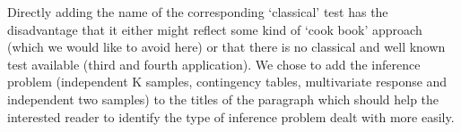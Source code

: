 \documentclass[11pt]{article}
\begin{document}
\begin{enumerate}
Directly adding the name of the
corresponding `classical' test has the disadvantage that it either might
reflect some kind of `cook book' approach (which we would like to avoid
here) or that there is no classical and well known test available (third and
fourth application). We chose to add the inference problem (independent K
samples, contingency tables, multivariate response and independent two
samples) to the titles of the paragraph which should help the interested
reader to identify the type of inference problem dealt with more easily.
 

\end{enumerate}
\end{document}
